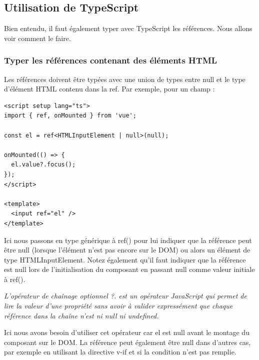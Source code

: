 \documentclass{article}
\begin{document}
\subsection{Utilisation de {\color{monOrange}TypeScript}}
Bien entendu, il faut également typer avec {\color{monOrange}TypeScript} les références. Nous allons voir comment le faire.

\subsubsection{Typer les références contenant des éléments HTML}
Les références doivent être typées avec une union de types entre {\color{monOrange}null} et le type d'élément HTML contenu dans la {\color{monOrange}ref}. Par exemple, pour un champ :
\begin{verbatim}
<script setup lang="ts">
import { ref, onMounted } from 'vue';

const el = ref<HTMLInputElement | null>(null);

onMounted(() => {
  el.value?.focus();
});
</script>

<template>
  <input ref="el" />
</template>
\end{verbatim}
Ici nous passons en type générique {\tt <HTMLInputElement | null>} à {\color{monOrange}ref()} pour lui indiquer que la référence peut être null (lorsque l'élément n'est pas encore sur le DOM) ou alors un élément de type {\color{monOrange}HTMLInputElement}. Notez également qu'il faut indiquer que la référence est null lors de l'initialisation du composant en passant null comme valeur initiale à {\color{monOrange}ref()}.

{\em L'opérateur de chaînage optionnel ?. est un opérateur JavaScript qui permet de lire la valeur d'une propriété sans avoir à valider expressément que chaque référence dans la chaîne n'est ni {\color{monOrange}null} ni {\color{monOrange}undefined}.}

Ici nous avons besoin d'utiliser cet opérateur car {\color{monOrange}el} est {\color{monOrange}null} avant le montage du composant sur le DOM. La référence peut également être null dans d'autres cas, par exemple en utilisant la directive {\color{monOrange}v-if} et si la condition n'est pas remplie.
\end{document}
